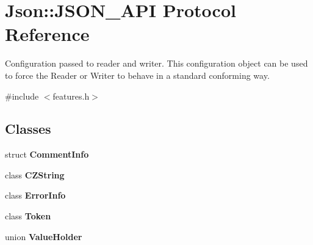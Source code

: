 \hypertarget{protocol_json_1_1_j_s_o_n___a_p_i}{\section{Json\-:\-:J\-S\-O\-N\-\_\-\-A\-P\-I Protocol Reference}
\label{protocol_json_1_1_j_s_o_n___a_p_i}
}


Configuration passed to reader and writer. This configuration object can be used to force the Reader or Writer to behave in a standard conforming way.  




{\ttfamily \#include $<$features.\-h$>$}

\subsection*{Classes}
\begin{DoxyCompactItemize}
\item 
struct {\bfseries Comment\-Info}
\item 
class {\bfseries C\-Z\-String}
\item 
class {\bfseries Error\-Info}
\item 
class {\bfseries Token}
\item 
union {\bfseries Value\-Holder}
\end{DoxyCompactItemize}

